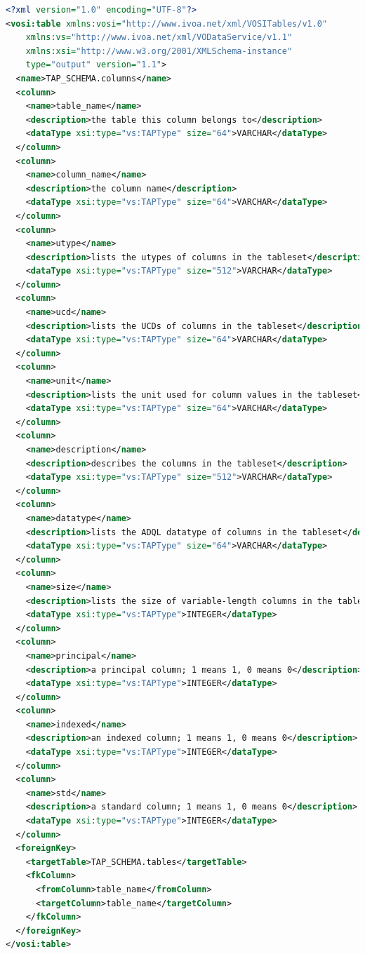 \documentclass[11pt,letter]{ivoa}
\begin{document}
\begin{lstlisting}[language=XML]
<?xml version="1.0" encoding="UTF-8"?>
<vosi:table xmlns:vosi="http://www.ivoa.net/xml/VOSITables/v1.0" 
    xmlns:vs="http://www.ivoa.net/xml/VODataService/v1.1" 
    xmlns:xsi="http://www.w3.org/2001/XMLSchema-instance"
    type="output" version="1.1">
  <name>TAP_SCHEMA.columns</name>
  <column>
    <name>table_name</name>
    <description>the table this column belongs to</description>
    <dataType xsi:type="vs:TAPType" size="64">VARCHAR</dataType>
  </column>
  <column>
    <name>column_name</name>
    <description>the column name</description>
    <dataType xsi:type="vs:TAPType" size="64">VARCHAR</dataType>
  </column>
  <column>
    <name>utype</name>
    <description>lists the utypes of columns in the tableset</description>
    <dataType xsi:type="vs:TAPType" size="512">VARCHAR</dataType>
  </column>
  <column>
    <name>ucd</name>
    <description>lists the UCDs of columns in the tableset</description>
    <dataType xsi:type="vs:TAPType" size="64">VARCHAR</dataType>
  </column>
  <column>
    <name>unit</name>
    <description>lists the unit used for column values in the tableset</description>
    <dataType xsi:type="vs:TAPType" size="64">VARCHAR</dataType>
  </column>
  <column>
    <name>description</name>
    <description>describes the columns in the tableset</description>
    <dataType xsi:type="vs:TAPType" size="512">VARCHAR</dataType>
  </column>
  <column>
    <name>datatype</name>
    <description>lists the ADQL datatype of columns in the tableset</description>
    <dataType xsi:type="vs:TAPType" size="64">VARCHAR</dataType>
  </column>
  <column>
    <name>size</name>
    <description>lists the size of variable-length columns in the tableset</description>
    <dataType xsi:type="vs:TAPType">INTEGER</dataType>
  </column>
  <column>
    <name>principal</name>
    <description>a principal column; 1 means 1, 0 means 0</description>
    <dataType xsi:type="vs:TAPType">INTEGER</dataType>
  </column>
  <column>
    <name>indexed</name>
    <description>an indexed column; 1 means 1, 0 means 0</description>
    <dataType xsi:type="vs:TAPType">INTEGER</dataType>
  </column>
  <column>
    <name>std</name>
    <description>a standard column; 1 means 1, 0 means 0</description>
    <dataType xsi:type="vs:TAPType">INTEGER</dataType>
  </column>
  <foreignKey>
    <targetTable>TAP_SCHEMA.tables</targetTable>
    <fkColumn>
      <fromColumn>table_name</fromColumn>
      <targetColumn>table_name</targetColumn>
    </fkColumn>
  </foreignKey>
</vosi:table>
\end{lstlisting}
\end{document}
